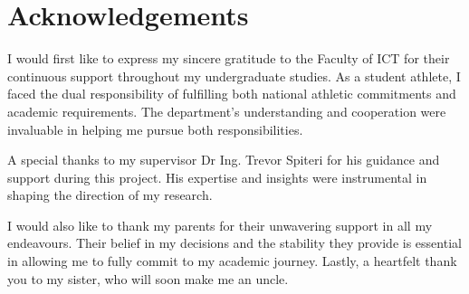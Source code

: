 \chapter*{Acknowledgements}

I would first like to express my sincere gratitude to the Faculty of ICT for their continuous support throughout my undergraduate studies. As a student athlete, I faced the dual responsibility of fulfilling both national athletic commitments and academic requirements. The department’s understanding and cooperation were invaluable in helping me pursue both responsibilities.

A special thanks to my supervisor Dr Ing. Trevor Spiteri for his guidance and support during this project. His expertise and insights were instrumental in shaping the direction of my research. 

I would also like to thank my parents for their unwavering support in all my endeavours. Their belief in my decisions and the stability they provide is essential in allowing me to fully commit to my academic journey. Lastly, a heartfelt thank you to my sister, who will soon make me an uncle.